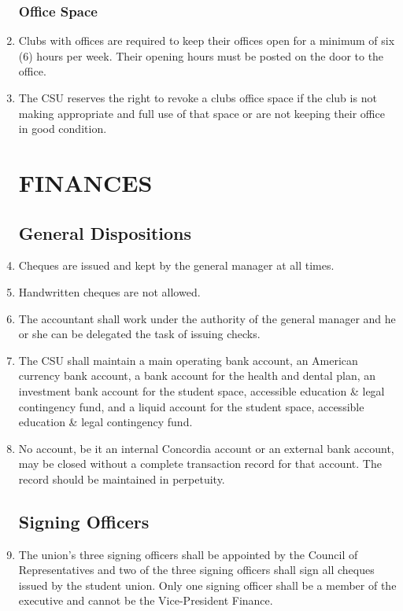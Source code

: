 \documentclass[oneside]{book}
\begin{document}
\begin{enumerate}
\section{\label{Office_Space}Office Space }
\item Clubs with offices are required to keep their offices open for a minimum
of six (6) hours per week. Their opening hours must be posted on the
door to the office. 
\item The CSU reserves the right to revoke a clubs office space if the club
is not making appropriate and full use of that space or are not keeping
their office in good condition. 

\part{\label{FINANCES}FINANCES }


\chapter{\label{General_Dispositions}General Dispositions }
\item Cheques are issued and kept by the general manager at all times.
\item Handwritten cheques are not allowed.
\item The accountant shall work under the authority of the general manager
and he or she can be delegated the task of issuing checks. 
\item \label{enu:banking-institution-and-accounts}The CSU shall maintain a main operating bank
account, an American currency bank account, a bank account for the health and dental plan, an investment
bank account for the student space, accessible education \& legal contingency fund, and a liquid account
for the student space, accessible education \& legal contingency fund. 
\item No account, be it an internal Concordia account or an external bank account, may be closed without a
complete transaction record for that account. The record should be maintained in perpetuity.


\chapter{\label{Signing_Officers}Signing Officers }
\item The union's three signing officers shall be appointed by the Council
of Representatives and two of the three signing officers shall sign
all cheques issued by the student union. Only one signing
officer shall be a member of the executive and cannot be the 
Vice-President Finance.


\end{enumerate}
\end{document}
